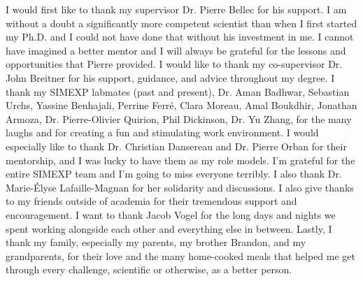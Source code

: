 \documentclass[
12pt, %
oneside, %
english, %
onehalfspacing, %
liststotoc, %
toctotoc, %
headsepline, %
consistentlayout, %
]{McGillThesis} %
\begin{document}

\begin{acknowledgements}
\addchaptertocentry{\acknowledgementname} %
I would first like to thank my supervisor Dr. Pierre Bellec for his support. I am without a doubt a significantly more competent scientist than when I first started my Ph.D. and I could not have done that without his investment in me. I cannot have imagined a better mentor and I will always be grateful for the lessons and opportunities that Pierre provided. I would like to thank my co-supervisor Dr. John Breitner for his support, guidance, and advice throughout my degree. I thank my SIMEXP labmates (past and present), Dr. Aman Badhwar, Sebastian Urchs, Yassine Benhajali, Perrine Ferré, Clara Moreau, Amal Boukdhir, Jonathan Armoza, Dr. Pierre-Olivier Quirion, Phil Dickinson, Dr. Yu Zhang, for the many laughs and for creating a fun and stimulating work environment. I would especially like to thank Dr. Christian Dansereau and Dr. Pierre Orban for their mentorship, and I was lucky to have them as my role models. I'm grateful for the entire SIMEXP team and I'm going to miss everyone terribly. I also thank Dr. Marie-Élyse Lafaille-Magnan for her solidarity and discussions. I also give thanks to my friends outside of academia for their tremendous support and encouragement. I want to thank Jacob Vogel for the long days and nights we spent working alongside each other and everything else in between. Lastly, I thank my family, especially my parents, my brother Brandon, and my grandparents, for their love and the many home-cooked meals that helped me get through every challenge, scientific or otherwise, as a better person.
\end{acknowledgements}





\cleardoublepage

\end{document}
